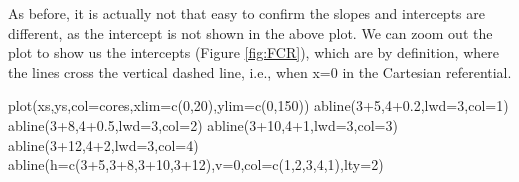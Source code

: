 \documentclass[
]{book}
\newenvironment{Shaded}{\begin{snugshade}}{\end{snugshade}}
\newcommand{\AttributeTok}[1]{\textcolor[rgb]{0.77,0.63,0.00}{#1}}
\newcommand{\DecValTok}[1]{\textcolor[rgb]{0.00,0.00,0.81}{#1}}
\newcommand{\FloatTok}[1]{\textcolor[rgb]{0.00,0.00,0.81}{#1}}
\newcommand{\FunctionTok}[1]{\textcolor[rgb]{0.00,0.00,0.00}{#1}}
\newcommand{\NormalTok}[1]{#1}
\newcommand{\SpecialCharTok}[1]{\textcolor[rgb]{0.00,0.00,0.00}{#1}}
\begin{document}
As before, it is actually not that easy to confirm the slopes and intercepts are different, as the intercept is not shown in the above plot. We can zoom out the plot to show us the intercepts (Figure \ref{fig:FCR}), which are by definition, where the lines cross the vertical dashed line, i.e., when x=0 in the Cartesian referential.

\begin{Shaded}
\begin{Highlighting}[]
\FunctionTok{plot}\NormalTok{(xs,ys,}\AttributeTok{col=}\NormalTok{cores,}\AttributeTok{xlim=}\FunctionTok{c}\NormalTok{(}\DecValTok{0}\NormalTok{,}\DecValTok{20}\NormalTok{),}\AttributeTok{ylim=}\FunctionTok{c}\NormalTok{(}\DecValTok{0}\NormalTok{,}\DecValTok{150}\NormalTok{))}
\FunctionTok{abline}\NormalTok{(}\DecValTok{3}\SpecialCharTok{+}\DecValTok{5}\NormalTok{,}\DecValTok{4}\FloatTok{+0.2}\NormalTok{,}\AttributeTok{lwd=}\DecValTok{3}\NormalTok{,}\AttributeTok{col=}\DecValTok{1}\NormalTok{)}
\FunctionTok{abline}\NormalTok{(}\DecValTok{3}\SpecialCharTok{+}\DecValTok{8}\NormalTok{,}\DecValTok{4}\FloatTok{+0.5}\NormalTok{,}\AttributeTok{lwd=}\DecValTok{3}\NormalTok{,}\AttributeTok{col=}\DecValTok{2}\NormalTok{)}
\FunctionTok{abline}\NormalTok{(}\DecValTok{3}\SpecialCharTok{+}\DecValTok{10}\NormalTok{,}\DecValTok{4}\SpecialCharTok{+}\DecValTok{1}\NormalTok{,}\AttributeTok{lwd=}\DecValTok{3}\NormalTok{,}\AttributeTok{col=}\DecValTok{3}\NormalTok{)}
\FunctionTok{abline}\NormalTok{(}\DecValTok{3}\SpecialCharTok{+}\DecValTok{12}\NormalTok{,}\DecValTok{4}\SpecialCharTok{+}\DecValTok{2}\NormalTok{,}\AttributeTok{lwd=}\DecValTok{3}\NormalTok{,}\AttributeTok{col=}\DecValTok{4}\NormalTok{)}
\FunctionTok{abline}\NormalTok{(}\AttributeTok{h=}\FunctionTok{c}\NormalTok{(}\DecValTok{3}\SpecialCharTok{+}\DecValTok{5}\NormalTok{,}\DecValTok{3}\SpecialCharTok{+}\DecValTok{8}\NormalTok{,}\DecValTok{3}\SpecialCharTok{+}\DecValTok{10}\NormalTok{,}\DecValTok{3}\SpecialCharTok{+}\DecValTok{12}\NormalTok{),}\AttributeTok{v=}\DecValTok{0}\NormalTok{,}\AttributeTok{col=}\FunctionTok{c}\NormalTok{(}\DecValTok{1}\NormalTok{,}\DecValTok{2}\NormalTok{,}\DecValTok{3}\NormalTok{,}\DecValTok{4}\NormalTok{,}\DecValTok{1}\NormalTok{),}\AttributeTok{lty=}\DecValTok{2}\NormalTok{)}
\end{Highlighting}
\end{Shaded}
\end{document}
